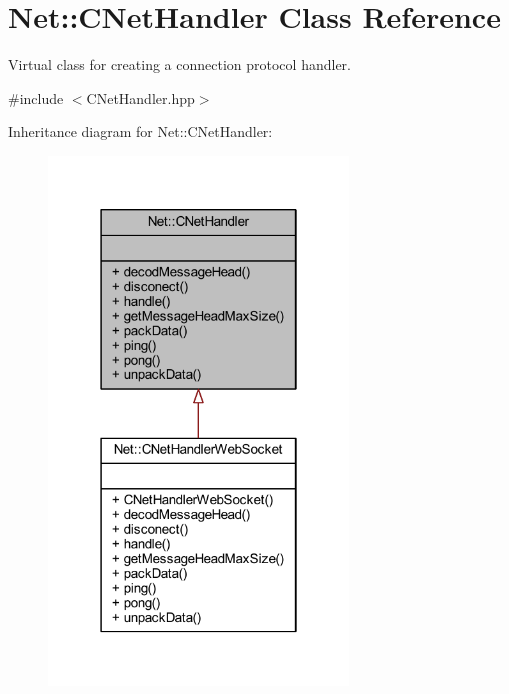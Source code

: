 \hypertarget{class_net_1_1_c_net_handler}{}\section{Net\+:\+:C\+Net\+Handler Class Reference}
\label{class_net_1_1_c_net_handler}


Virtual class for creating a connection protocol handler.  




{\ttfamily \#include $<$C\+Net\+Handler.\+hpp$>$}



Inheritance diagram for Net\+:\+:C\+Net\+Handler\+:
\nopagebreak
\begin{figure}[H]
\begin{center}
\leavevmode
\includegraphics[width=226pt]{class_net_1_1_c_net_handler__inherit__graph}
\end{center}
\end{figure}


